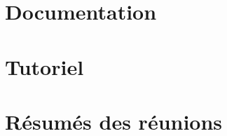 \documentclass[a4paper,11pt]{report}
\begin{document}
\chapter{Documentation}




\chapter{Tutoriel}



\chapter{Résumés des réunions}











\end{document}
